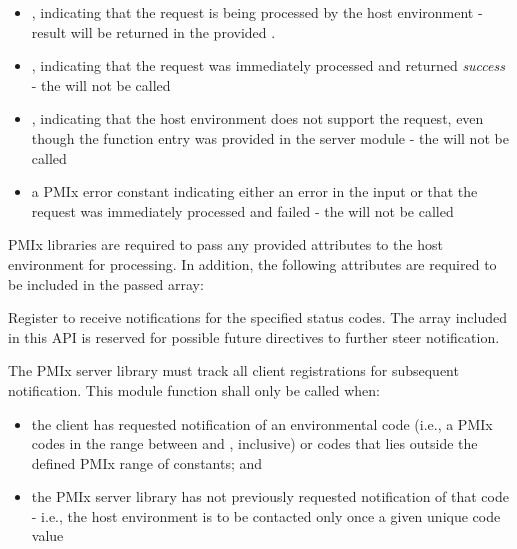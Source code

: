 \begin{itemize}
    \item {}, indicating that the request is being processed by the host environment - result will be returned in the provided .
    \item {}, indicating that the request was immediately processed and returned \textit{success} - the  will not be called
    \item {}, indicating that the host environment does not support the request, even though the function entry was provided in the server module - the  will not be called
    \item a PMIx error constant indicating either an error in the input or that the request was immediately processed and failed - the  will not be called
\end{itemize}

\reqattrstart
\ac{PMIx} libraries are required to pass any provided attributes to the host environment for processing. In addition, the following attributes are required to be included in the passed  array:


\reqattrend

\descr

Register to receive notifications for the specified status codes. The  array included in this API is reserved for possible future directives to further steer notification.

\adviceimplstart
The \ac{PMIx} server library must track all client registrations for subsequent notification. This module function shall only be called when:

\begin{itemize}
    \item the client has requested notification of an environmental code (i.e., a \ac{PMIx} codes in the range between  and , inclusive) or codes that lies outside the defined \ac{PMIx} range of constants; and
    \item the \ac{PMIx} server library has not previously requested notification of that code - i.e., the host environment is to be contacted only once a given unique code value
\end{itemize}

